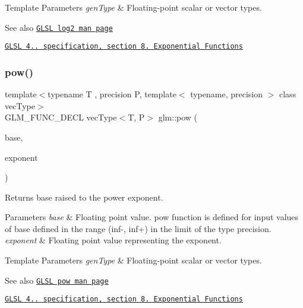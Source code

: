 \begin{DoxyTemplParams}{Template Parameters}
{\em gen\+Type} & Floating-\/point scalar or vector types.\\
\hline
\end{DoxyTemplParams}
\begin{DoxySeeAlso}{See also}
\href{http://www.opengl.org/sdk/docs/manglsl/xhtml/log2.xml}{\tt G\+L\+SL log2 man page} 

\href{http://www.opengl.org/registry/doc/GLSLangSpec.4.20.8.pdf}{\tt G\+L\+SL 4.. specification, section 8. Exponential Functions} 
\end{DoxySeeAlso}
\mbox{\label{group__core__func__exponential_ga082b332a4b7c6ad1d43e09ff19e214dd}} 
\subsubsection{\texorpdfstring{pow()}{pow()}}
{\footnotesize\ttfamily template$<$typename T , precision P, template$<$ typename, precision $>$ class vec\+Type$>$ \\
G\+L\+M\+\_\+\+F\+U\+N\+C\+\_\+\+D\+E\+CL vec\+Type$<$T, P$>$ glm\+::pow (\begin{DoxyParamCaption}\item[{vec\+Type$<$ T, P $>$ const \&}]{base,  }\item[{vec\+Type$<$ T, P $>$ const \&}]{exponent }\end{DoxyParamCaption})}

Returns \textquotesingle{}base\textquotesingle{} raised to the power \textquotesingle{}exponent\textquotesingle{}.


\begin{DoxyParams}{Parameters}
{\em base} & Floating point value. pow function is defined for input values of \textquotesingle{}base\textquotesingle{} defined in the range (inf-\/, inf+) in the limit of the type precision. \\
\hline
{\em exponent} & Floating point value representing the \textquotesingle{}exponent\textquotesingle{}. \\
\hline
\end{DoxyParams}

\begin{DoxyTemplParams}{Template Parameters}
{\em gen\+Type} & Floating-\/point scalar or vector types.\\
\hline
\end{DoxyTemplParams}
\begin{DoxySeeAlso}{See also}
\href{http://www.opengl.org/sdk/docs/manglsl/xhtml/pow.xml}{\tt G\+L\+SL pow man page} 

\href{http://www.opengl.org/registry/doc/GLSLangSpec.4.20.8.pdf}{\tt G\+L\+SL 4.. specification, section 8. Exponential Functions} 
\end{DoxySeeAlso}
\mbox{\label{group__core__func__exponential_gae7ac2e44c14d4e8004098d0bfba6e2b8}} 
